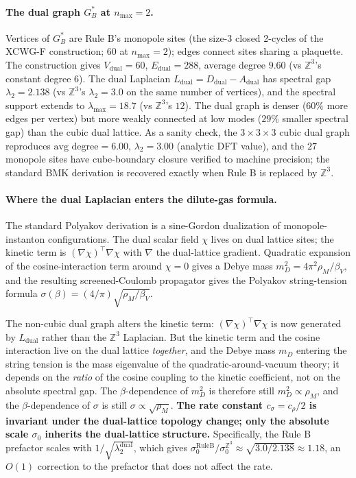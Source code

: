 \documentclass[11pt]{article}
\begin{document}
\paragraph{The dual graph $G_B^*$ at $n_\text{max}=2$.} Vertices of $G_B^*$ are
Rule B's monopole sites (the size-3 closed 2-cycles of the XCWG-F
construction; 60 at $n_\text{max}=2$); edges connect sites sharing a
plaquette. The construction gives $V_\text{dual}=60$,
$E_\text{dual}=288$, average degree $9.60$ (vs $\mathbb{Z}^3$'s constant degree
$6$). The dual Laplacian $L_\text{dual}=D_\text{dual}-A_\text{dual}$ has
spectral gap $\lambda_2=2.138$ (vs $\mathbb{Z}^3$'s $\lambda_2=3.0$ on the
same number of vertices), and the spectral support extends to
$\lambda_\text{max}=18.7$ (vs $\mathbb{Z}^3$'s $12$). The dual graph is
denser ($60\%$ more edges per vertex) but more weakly connected at low
modes ($29\%$ smaller spectral gap) than the cubic dual lattice. As a
sanity check, the $3\times 3\times 3$ cubic dual graph reproduces
$\text{avg degree}=6.00$, $\lambda_2=3.00$ (analytic DFT value), and the $27$
monopole sites have cube-boundary closure verified to machine precision; the
standard BMK derivation is recovered exactly when Rule B is replaced by
$\mathbb{Z}^3$.

\paragraph{Where the dual Laplacian enters the dilute-gas formula.} The standard
Polyakov derivation \cite{polyakov1977,banks_myerson_kogut1977} is a sine-Gordon dualization
of monopole-instanton configurations. The dual scalar field $\chi$ lives on
dual lattice sites; the kinetic term is $(\nabla\chi)^\top\nabla\chi$ with
$\nabla$ the dual-lattice gradient. Quadratic expansion of the
cosine-interaction term around $\chi=0$ gives a Debye mass
$m_D^2=4\pi^2\rho_M/\beta_V$, and the resulting screened-Coulomb propagator
gives the Polyakov string-tension formula $\sigma(\beta)=(4/\pi)\sqrt{\rho_M/\beta_V}$.

The non-cubic dual graph alters the kinetic term: $(\nabla\chi)^\top\nabla\chi$
is now generated by $L_\text{dual}$ rather than the $\mathbb{Z}^3$ Laplacian.
But the kinetic term and the cosine interaction live on the dual lattice
\emph{together}, and the Debye mass $m_D$ entering the string tension is the
mass eigenvalue of the quadratic-around-vacuum theory; it depends on the
\emph{ratio} of the cosine coupling to the kinetic coefficient, not on the
absolute spectral gap. The $\beta$-dependence of $m_D^2$ is therefore still
$m_D^2\propto\rho_M$, and the $\beta$-dependence of $\sigma$ is still
$\sigma\propto\sqrt{\rho_M}$. \textbf{The rate constant
$c_\sigma=c_\rho/2$ is invariant under the dual-lattice topology change;
only the absolute scale $\sigma_0$ inherits the dual-lattice structure.}
Specifically, the Rule B prefactor scales with $1/\sqrt{\lambda_2^\text{dual}}$,
which gives $\sigma_0^\text{RuleB}/\sigma_0^{\mathbb{Z}^3}\approx
\sqrt{3.0/2.138}\approx 1.18$, an $O(1)$ correction to the prefactor that does
not affect the rate.
\end{document}
